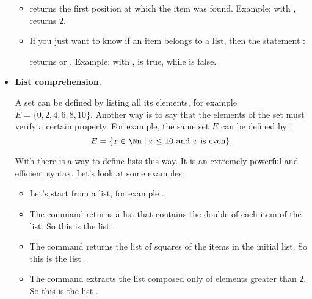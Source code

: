 \documentclass[11pt,class=report,crop=false]{standalone}
\begin{document}
\begin{cours}
\begin{itemize}
\begin{itemize}

    \item {}
    returns the first position at which the item was found. Example: with ,
    returns $2$.

  \item {} 
  If you just want to know if an item belongs to a list, then the statement :
  
  returns  or .
  Example: with ,
   \og{}\fg{} is true, while \og{}\fg{} is false.
  
\end{itemize}
   
  \item \textbf{List comprehension.}
  
  
  A set can be defined by listing all its elements, for example $E = \{0,2,4,6,8,10\}$. Another way is to say that the elements of the set must verify a certain property. For example, the same set $E$ can be defined by :
  $$E = \{ x \in \Nn \mid x \le 10 \text{ and } x \text{ is even} \}.$$
  
  With \Python{} there is a way to define lists this way. It is an extremely powerful and efficient syntax. Let's look at some examples:
  \begin{itemize}
    \item Let's start from a list, for example .
    
    \item The command  returns a list that contains the double of each item of the  list. So this is the list \ci{[2,4,6,8,...]}.
    
    \item The command  returns the list of squares of the items in the initial list. So this is the list \ci{[1,4,9,16,...]}.
    
    \item The command 
    extracts the list composed only of elements greater than $2$. So this is the list \ci{[3,4,5,6,7,6,5,4,3]}.
	\end{itemize}
	

\end{itemize}
\end{cours}
\end{document}
